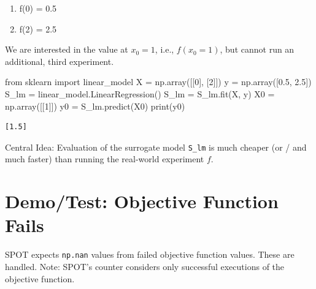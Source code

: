 \documentclass[
  letterpaper,
  DIV=11,
  numbers=noendperiod]{scrreprt}
\newenvironment{Shaded}{\begin{snugshade}}{\end{snugshade}}
\newcommand{\BuiltInTok}[1]{\textcolor[rgb]{0.00,0.23,0.31}{#1}}
\newcommand{\DecValTok}[1]{\textcolor[rgb]{0.68,0.00,0.00}{#1}}
\newcommand{\FloatTok}[1]{\textcolor[rgb]{0.68,0.00,0.00}{#1}}
\newcommand{\ImportTok}[1]{\textcolor[rgb]{0.00,0.46,0.62}{#1}}
\newcommand{\NormalTok}[1]{\textcolor[rgb]{0.00,0.23,0.31}{#1}}
\newcommand{\OperatorTok}[1]{\textcolor[rgb]{0.37,0.37,0.37}{#1}}
\providecommand{\tightlist}{%
  \setlength{\itemsep}{0pt}\setlength{\parskip}{0pt}}\usepackage{longtable,booktabs,array}
\begin{document}
\begin{enumerate}
\def\labelenumi{\arabic{enumi}.}
\tightlist
\item
  f(0) = 0.5
\item
  f(2) = 2.5
\end{enumerate}

We are interested in the value at \(x_0 = 1\), i.e., \(f(x_0 = 1)\), but
cannot run an additional, third experiment.

\begin{Shaded}
\begin{Highlighting}[]
\ImportTok{from}\NormalTok{ sklearn }\ImportTok{import}\NormalTok{ linear\_model}
\NormalTok{X }\OperatorTok{=}\NormalTok{ np.array([[}\DecValTok{0}\NormalTok{], [}\DecValTok{2}\NormalTok{]])}
\NormalTok{y }\OperatorTok{=}\NormalTok{ np.array([}\FloatTok{0.5}\NormalTok{, }\FloatTok{2.5}\NormalTok{])}
\NormalTok{S\_lm }\OperatorTok{=}\NormalTok{ linear\_model.LinearRegression()}
\NormalTok{S\_lm }\OperatorTok{=}\NormalTok{ S\_lm.fit(X, y)}
\NormalTok{X0 }\OperatorTok{=}\NormalTok{ np.array([[}\DecValTok{1}\NormalTok{]])}
\NormalTok{y0 }\OperatorTok{=}\NormalTok{ S\_lm.predict(X0)}
\BuiltInTok{print}\NormalTok{(y0)}
\end{Highlighting}
\end{Shaded}

\begin{verbatim}
[1.5]
\end{verbatim}

Central Idea: Evaluation of the surrogate model \texttt{S\_lm} is much
cheaper (or / and much faster) than running the real-world experiment
\(f\).

\hypertarget{demotest-objective-function-fails}{%
\section{Demo/Test: Objective Function
Fails}\label{demotest-objective-function-fails}}

SPOT expects \texttt{np.nan} values from failed objective function
values. These are handled. Note: SPOT's counter considers only
successful executions of the objective function.
\end{document}
